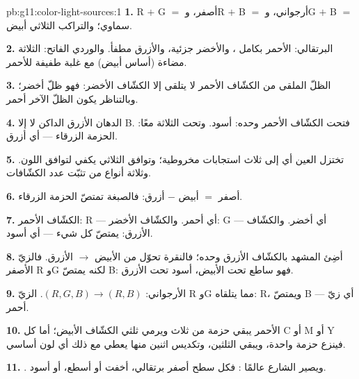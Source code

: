 \begin{solution}{pb:g11:color-light-sources:1}
\textbf{1.} R $+$ G $=$ أصفر، وR $+$ B $=$ أرجواني، وG $+$ B $=$ سماوي؛
والتراكب الثلاثي أبيض.

\textbf{2.} البرتقالي: الأحمر بكامل ، والأخضر  جزئية، والأزرق
مطفأ. والوردي الفاتح: الثلاثة مضاءة (أساس أبيض) مع غلبة طفيفة للأحمر.

\textbf{3.} الظلّ الملقى من الكشّاف الأحمر لا يتلقى إلا الكشّاف
الأخضر: فهو ظلّ أخضر؛ وبالتناظر يكون الظلّ الآخر أحمر.

\textbf{4.} الدهان الأزرق الداكن لا  إلا B. فتحت الكشّاف الأحمر وحده:
أسود. وتحت الثلاثة معًا:  الحزمة الزرقاء --- أي أزرق.

\textbf{5.} تختزل العين أي  إلى ثلاث استجابات مخروطية؛
وتوافق الثلاثي يكفي لتوافق اللون. وثلاثة أنواع من  تثبّت
عدد الكشّافات.

\textbf{6.} أصفر $=$ أبيض $-$ أزرق: فالصبغة تمتصّ الحزمة الزرقاء.

\textbf{7.} الكشّاف الأحمر:  R --- أي أحمر. والكشّاف الأخضر:  G ---
أي أخضر. والكشّاف الأزرق: يمتصّ كل شيء --- أي أسود.

\textbf{8.} أضِئ المشهد بالكشّاف الأزرق وحده؛ فالنقرة تحوّل
من الأبيض $\to$ الأزرق. فالزيّ الأصفر  R وG لكنه يمتصّ B:
فهو ساطع تحت الأبيض، أسود تحت الأزرق.

\textbf{9.}  الأرجواني: $(R, G, B) \to (R, B)$.  الزيّ
R وG مما يتلقاه:  R، ويمتصّ B --- أي زيّ أحمر.

\textbf{10.}  الأحمر يبقي حزمة من ثلاث ويرمي ثلثي
 الكشّاف الأبيض؛ أما كل  C أو M أو Y فينزع حزمة واحدة، ويبقي
الثلثين، وتكديس اثنين منها يعطي مع ذلك أي لون أساسي.

\textbf{11.} . ويصير الشارع عالمًا : فكل سطح أصفر برتقالي، أخفت أو أسطع، أو أسود.


\end{solution}
